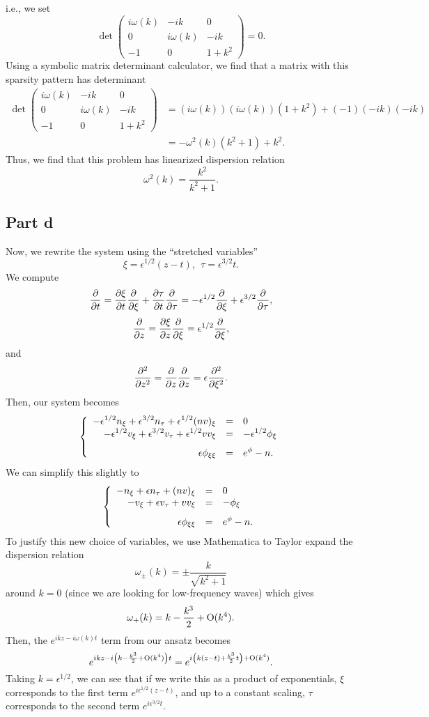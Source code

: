 \documentclass{article}
\begin{document}
i.e., we set 
\[
\det\begin{pmatrix}
	i\omega(k) &-ik &0\\
	0 &i\omega(k) &-ik\\
	-1 &0 &1+k^2
\end{pmatrix}=0.
\]
Using a symbolic matrix determinant calculator, we find that a matrix with this sparsity pattern has determinant
\begin{align*}
\det\begin{pmatrix}
	i\omega(k) &-ik &0\\
	0 &i\omega(k) &-ik\\
	-1 &0 &1+k^2
\end{pmatrix}&=(i\omega(k))(i\omega(k))(1+k^2)+(-1)(-ik)(-ik)\\&=
-\omega^2(k)(k^2+1)+k^2.
\end{align*}
Thus, we find that this problem has linearized dispersion relation
\[
\omega^2(k)=\frac{k^2}{k^2+1}.
\]
\subsection{Part d}
Now, we rewrite the system using the ``stretched variables''
\[
\xi=\epsilon^{1/2}(z-t), ~~\tau=\epsilon^{3/2} t.
\]
We compute
\begin{align*}
\frac{\partial }{\partial t}=\frac{\partial \xi}{\partial t}\frac{\partial }{\partial \xi}+\frac{\partial \tau}{\partial t}\frac{\partial }{\partial \tau}=-\epsilon^{1/2}\frac{\partial }{\partial \xi}+\epsilon^{3/2}\frac{\partial }{\partial \tau},
\end{align*}
\[
\frac{\partial }{\partial z}=\frac{\partial \xi}{\partial z}\frac{\partial }{\partial \xi}=\epsilon^{1/2}\frac{\partial }{\partial \xi},
\]
and 
\begin{align*}
\frac{\partial^{2} } {\partial z^{2}}=\frac{\partial }{\partial z}\frac{\partial }{\partial z}=\epsilon\frac{\partial^{2} } {\partial \xi^{2}}.
\end{align*}
Then, our system becomes
\[
\sys{
	\ds -\epsilon^{1/2}n_\xi+\epsilon^{3/2}n_\tau+\epsilon^{1/2}(nv)_\xi&=&0\\
	\vs\ds -\epsilon^{1/2}v_\xi+\epsilon^{3/2}v_\tau+\epsilon^{1/2}vv_\xi&=&\ds -\epsilon^{1/2}\phi_\xi\\
	\epsilon\phi_{\xi\xi}&=&\ds e^\phi-n.
}
\]
We can simplify this slightly to
\[
\sys{
	\ds -n_\xi+\epsilon n_\tau+(nv)_\xi&=&0\\
	\vs\ds -v_\xi+\epsilon v_\tau+vv_\xi&=&\ds -\phi_\xi\\
	\epsilon\phi_{\xi\xi}&=&\ds e^\phi-n.
}
\]
To justify this new choice of variables, we use Mathematica to Taylor expand the dispersion relation
\[
\omega_\pm(k)=\pm\frac{k}{\sqrt{k^2+1}}
\]
around $k=0$ (since we are looking for low-frequency waves) which gives
\[
\omega_+(k)=k-\frac{k^3}{2}+\operatorname{O}(k^4).
\]
Then, the $e^{ikz-i\omega(k)t}$ term from our ansatz becomes
\[
e^{ikz-i\left(k-\frac{k^3}{2}+\operatorname{O}(k^4)\right)t}=e^{i\left(k(z-t)+\frac{k^3}{2}t\right)+\operatorname{O}(k^4)}.
\]
Taking $k=\epsilon^{1/2}$, we can see that if we write this as a product of exponentials, $\xi$ corresponds to the first term $e^{i\epsilon^{1/2}(z-t)}$, and up to a constant scaling, $\tau$ corresponds to the second term $e^{i\epsilon^{3/2}t}$.
\end{document}
